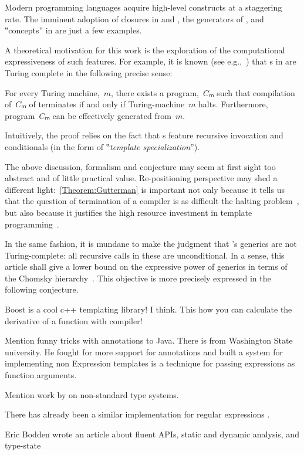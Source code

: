 Modern programming languages acquire high-level constructs
  at a staggering rate.
The imminent adoption of closures in \Java and \CC,
  the generators of \CSharp, and ‟concepts” in
  \CC are just a few examples.

A theoretical motivation for this work
  is the exploration of the computational
  expressiveness of such features.
For example, it is known (see e.g.,~\cite{Gutterman:2003}) that
  s in \CC are Turing complete in the following precise sense:

\begin{Theorem}
  \label{Theorem:Gutterman}
  For every Turing machine,~$m$, there exists a \CC program,~$Cₘ$ such that
    compilation of~$Cₘ$ of terminates if and only if
      Turing-machine~$m$ halts.
  Furthermore, program~$Cₘ$ can be effectively generated from~$m$.
\end{Theorem}

Intuitively, the proof relies on the fact that s
  feature recursive invocation and conditionals (in the form of
  ‟\emph{template specialization}”).

The above discussion, formalism and conjecture may seem at first sight too abstract
  and of little practical value.
Re-positioning perspective may shed a different light:~\cref{Theorem:Gutterman} is important not only because it tells us
  that the question of termination of a \CC compiler is as difficult
  the halting problem~\cite{Turing:1936}, but also because it
  justifies the high resource investment in
  template programming~\cite{Musser:Stepanov:1989,Dehnert:Stepanov:2000
  ,Backhouse:Jansson:1999, Austern:1998,Bracha:Odersky:Stoutamire:Wadler:98,X:Garcia:Jarvi:Lumsdaine:Siek:Willcock:03}.
  
In the same fashion, it is mundane to make the judgment that
  \Java's generics are not Turing-complete: all recursive calls
  in these are unconditional.
In a sense, this article shall give a lower bound on the
  expressive power of \Java generics in terms of the Chomsky hierarchy~\cite{Chomsky:1963}.
This objective is more precisely expressed in the following conjecture.

Boost is a cool c++ templating library!\cite{Abrahams:Gurtovoy:04} I think. 
This how you can calculate the derivative of a function with \CC compiler! \cite{Gil:Gutterman:98}

Mention funny tricks with annotations to Java. There is \cite{Papi:08} from 
  Washington State university. He fought for more support for annotations 
  and built a system for implementing non
Expression templates is a \CC technique for passing expressions as function arguments. \cite{Veldhuizen:95}

Mention work by \cite{Bracha} on non-standard type systems.  

There has already been a similar \Java implementation for regular expressions
  .

Eric Bodden wrote an article about fluent APIs, static and dynamic analysis, and type-state~\cite{Bodden:14}


